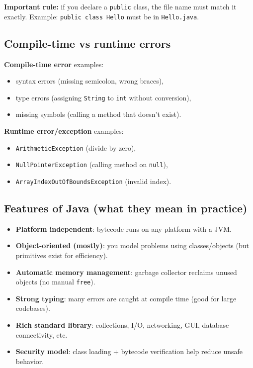 \documentclass[11pt]{article}
\begin{document}
\textbf{Important rule:} if you declare a \texttt{public} class, the file name must match it exactly.
Example: \texttt{public class Hello} must be in \texttt{Hello.java}.

\subsection{Compile-time vs runtime errors}
\textbf{Compile-time error} examples:
\begin{itemize}
  \item syntax errors (missing semicolon, wrong braces),
  \item type errors (assigning \texttt{String} to \texttt{int} without conversion),
  \item missing symbols (calling a method that doesn't exist).
\end{itemize}

\textbf{Runtime error/exception} examples:
\begin{itemize}
  \item \texttt{ArithmeticException} (divide by zero),
  \item \texttt{NullPointerException} (calling method on \texttt{null}),
  \item \texttt{ArrayIndexOutOfBoundsException} (invalid index).
\end{itemize}

\subsection{Features of Java (what they mean in practice)}
\begin{itemize}
  \item \textbf{Platform independent}: bytecode runs on any platform with a JVM.
  \item \textbf{Object-oriented (mostly)}: you model problems using classes/objects (but primitives exist for efficiency).
  \item \textbf{Automatic memory management}: garbage collector reclaims unused objects (no manual \texttt{free}).
  \item \textbf{Strong typing}: many errors are caught at compile time (good for large codebases).
  \item \textbf{Rich standard library}: collections, I/O, networking, GUI, database connectivity, etc.
  \item \textbf{Security model}: class loading + bytecode verification help reduce unsafe behavior.
\end{itemize}
\notesources{\OOPSUnitISources}
\end{document}
